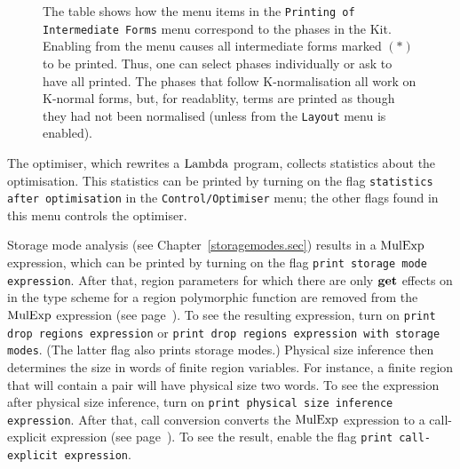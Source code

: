 \documentclass[12pt]{book}
\begin{document}
\begin{figure}
\begin{center}
\begin{tabular}{|l|l|l|}
\hline
\end{tabular}
\end{center}
\caption{The table shows how the menu items in the 
  {\tt Printing of Intermediate Forms} menu correspond to the phases
  in the Kit.  Enabling  from the  menu causes all intermediate forms marked $(\ast)$ to be
  printed.  Thus, one can select phases individually or ask to have all
  printed.  The phases that follow K-normalisation all work on
  K-normal forms, but, for readablity, terms are printed as though
  they had not been normalised (unless 
  from the {\tt Layout} menu is enabled).}
\label{phases.fig}
\end{figure}

The optimiser, which rewrites a $\hbox{\rm Lambda}$
program, collects statistics about the optimisation. This statistics
can be printed by turning on the flag
%
%
\texttt{statistics after optimisation} in the
\texttt{Control/Optimiser} menu; the other flags found in this menu
controls the optimiser.

Storage mode analysis (see Chapter~\ref{storagemodes.sec}) results in
a $\hbox{\rm MulExp}$ expression, which can be printed
by turning on the flag
%
\texttt{print storage mode expression}.  After that, region parameters
for which there are only $\mathop{\bf get}\nolimits$ effects on in the type scheme for a
region polymorphic function are removed from the $\hbox{\rm MulExp}$ expression
(see page~\pageref{bother-to-distinguish-get-n-put}).  To see the
resulting expression, turn on
%
\texttt{print drop regions expression} or \texttt{print drop regions
  expression with storage modes}. (The latter flag also prints storage
modes.)
%
%
Physical size inference then determines the size in words of finite
region variables.  For instance, a finite region that will contain a
pair will have physical size two words.  To see the expression after
physical size inference, turn on
%
\texttt{print physical size inference expression}.  After that,
%
call conversion converts the $\hbox{\rm MulExp}$ expression to a
call-explicit expression (see
page~\pageref{call-explicit}).  To see the result, enable the flag
\texttt{print call-explicit expression}.  
\end{document}
